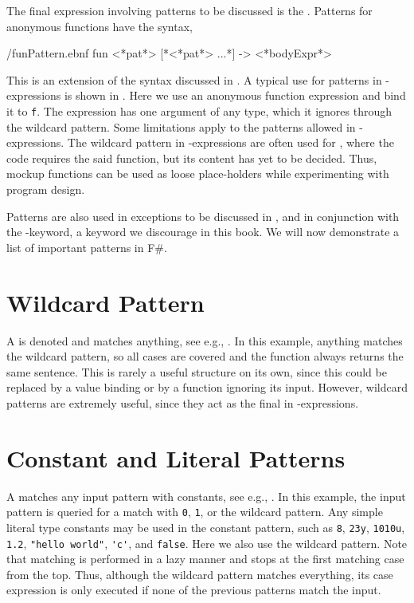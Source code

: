 \documentclass[springer.tex]{subfiles}
\begin{document}
The final expression involving patterns to be discussed is the . Patterns for anonymous functions have the syntax,
%
\begin{verbatimwrite}{\ebnf/funPattern.ebnf}
fun <*pat*> [*<*pat*> ...*] -> <*bodyExpr*>
\end{verbatimwrite}
%
This is an extension of the syntax discussed in . A typical use for patterns in -expressions is shown in .
%
%
Here we use an anonymous function expression and bind it to \lstinline{f}. The expression has one argument of any type, which it ignores through the wildcard pattern. Some limitations apply to the patterns allowed in -expressions. The wildcard pattern in -expressions are often used for , where the code requires the said function, but its content has yet to be decided. Thus, mockup functions can be used as loose place-holders while experimenting with program design.

Patterns are also used in exceptions to be discussed in , and in conjunction with the -keyword, a keyword we discourage in this book. We will now demonstrate a list of important patterns in F\#.

\section{Wildcard Pattern}
\label{sec:wildcardPattern}
A  is denoted \idx[_@\lstinline{_}]{\lexeme{_}} and matches anything, see e.g., .
%
%
In this example, anything matches the wildcard pattern, so all cases are covered and the function always returns the same sentence. This is rarely a useful structure on its own, since this could be replaced by a value binding or by a function ignoring its input. However, wildcard patterns are extremely useful, since they act as the final  in -expressions.

\section{Constant and Literal Patterns}
A  matches any input pattern with constants, see e.g., .
%
%
In this example, the input pattern is queried for a match with \lstinline{0}, \lstinline{1}, or the wildcard pattern. Any simple literal type constants may be used in the constant pattern, such as \lstinline{8}, \lstinline{23y}, \lstinline{1010u}, \lstinline{1.2}, \lstinline{"hello world"}, \lstinline{'c'}, and \lstinline{false}.  Here we also use the wildcard pattern. Note that matching is performed in a lazy manner and stops at the first matching case from the top. Thus, although the wildcard pattern matches everything, its case expression is only executed if none of the previous patterns match the input.
\end{document}
